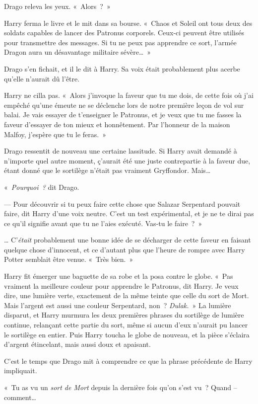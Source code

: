 Drago releva les yeux. «~Alors~?~»

Harry ferma le livre et le mit dans sa bourse. «~Chaos et Soleil ont tous deux des soldats capables de lancer des Patronus corporels. Ceux-ci peuvent être utilisés pour transmettre des messages. Si tu ne peux pas apprendre ce sort, l'armée Dragon aura un désavantage militaire sévère…~»

Drago s'en fichait, et il le dit à Harry. Sa voix était probablement plus acerbe qu'elle n'aurait dû l'être.

Harry ne cilla pas. «~Alors j'invoque la faveur que tu me dois, de cette fois où j'ai empêché qu'une émeute ne se déclenche lors de notre première leçon de vol sur balai. Je vais essayer de t'enseigner le Patronus, et je veux que tu me fasses la faveur d'essayer de ton mieux et honnêtement. Par l'honneur de la maison Malfoy, j'espère que tu le feras.~»

Drago ressentit de nouveau une certaine lassitude. Si Harry avait demandé à n'importe quel autre moment, ç'aurait été une juste contrepartie à la faveur due, étant donné que le sortilège n'était pas vraiment Gryffondor. Mais…

«~\emph{Pourquoi~?} dit Drago.

--- Pour découvrir si tu peux faire cette chose que Salazar Serpentard pouvait faire, dit Harry d'une voix neutre. C'est un test expérimental, et je ne te dirai pas ce qu'il signifie avant que tu ne l'aies exécuté. Vas-tu le faire~?~»

… C'\emph{était} probablement une bonne idée de se décharger de cette faveur en faisant quelque chose d'innocent, et ce d'autant plus que l'heure de rompre avec Harry Potter semblait être venue. «~Très bien.~»

Harry fit émerger une baguette de sa robe et la posa contre le globe. «~Pas vraiment la meilleure couleur pour apprendre le Patronus, dit Harry. Je veux dire, une lumière verte, exactement de la même teinte que celle du sort de Mort. Mais l'argent est aussi une couleur Serpentard, non~? \emph{Dulak.}~» La lumière disparut, et Harry murmura les deux premières phrases du sortilège de lumière continue, relançant cette partie du sort, même si aucun d'eux n'aurait pu lancer le sortilège en entier. Puis Harry toucha le globe de nouveau, et la pièce s'éclaira d'argent étincelant, mais aussi doux et apaisant.

C'est le temps que Drago mit à comprendre ce que la phrase précédente de Harry impliquait.

«~Tu as vu un \emph{sort de Mort} depuis la dernière fois qu'on s'est vu~? Quand -- comment…

